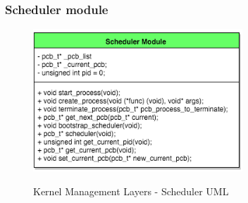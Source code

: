 \subsubsection{Scheduler module}

\begin{figure}[H]
\begin{center}
\includegraphics[width=0.7\textwidth]{includes/figures/chapter5_kernel_management_layer_scheduler_UML.png}  \\
\caption{Kernel Management Layers - Scheduler UML}
\end{center}
\label{fig:chapter5_kernel_management_layer_scheduler_UML}
\end{figure}


